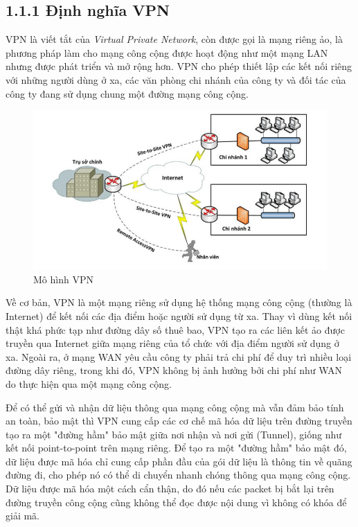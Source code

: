    \subsection*{1.1.1 Định nghĩa VPN}
    VPN là viết tắt của \textit{Virtual Private Network}, còn được gọi là mạng riêng ảo, là phương pháp làm cho mạng công cộng được hoạt động như một mạng LAN nhưng được phát triển và mở rộng hơn. VPN cho phép thiết lập các kết nối riêng với những người dùng ở xa, các văn phòng chi nhánh của công ty và đối tác của công ty đang sử dụng chung một đường mạng công cộng.
    \begin{figure}[htbp]
        \includegraphics[width=0.7\linewidth]{img/vpnmodel.png}
        \caption{Mô hình VPN}
    \end{figure}
    
    Về cơ bản, VPN là một mạng riêng sử dụng hệ thống mạng công cộng (thường là Internet) để kết nối các địa điểm hoặc người sử dụng từ xa. Thay vì dùng kết nối thật khá phức tạp như đường dây số thuê bao, VPN tạo ra các liên kết ảo được truyền qua Internet giữa mạng riêng của tổ chức với địa điểm người sử dụng ở xa. Ngoài ra, ở mạng WAN yêu cầu công ty phải trả chi phí để duy trì nhiều loại đường dây riêng, trong khi đó, VPN không bị ảnh hưởng bởi chi phí như WAN do thực hiện qua một mạng công cộng.

    Để có thể gửi và nhận dữ liệu thông qua mạng công cộng mà vẫn đảm bảo tính an toàn, bảo mật thì VPN cung cấp các cơ chế mã hóa dữ liệu trên đường truyền tạo ra một "đường hầm" bảo mật giữa nơi nhận và nơi gửi (Tunnel), giống như kết nối point-to-point trên mạng riêng. Để tạo ra một "đường hầm" bảo mật đó, dữ liệu được mã hóa chỉ cung cấp phần đầu của gói dữ liệu là thông tin về quãng đường đi, cho phép nó có thể di chuyển nhanh chóng thông qua mạng công cộng. Dữ liệu được mã hóa một cách cẩn thận, do đó nếu các packet bị bắt lại trên đường truyền công cộng cũng không thể đọc được nội dung vì không có khóa để giải mã.

